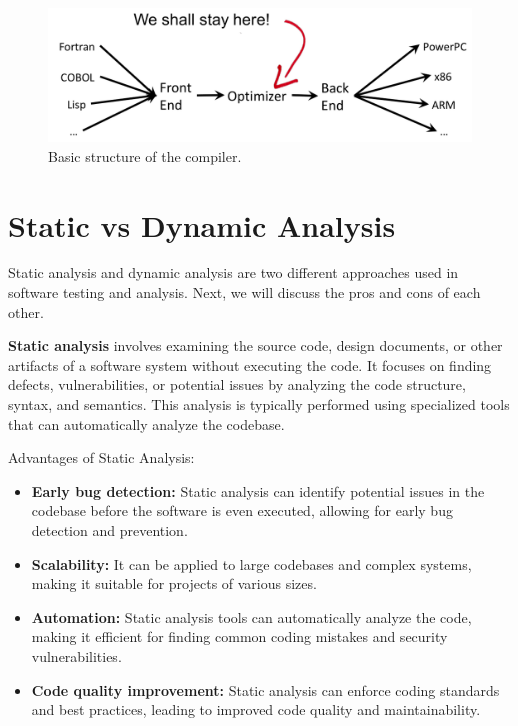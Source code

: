 \begin{figure}[ht]
    \centering
    \includegraphics[width=\textwidth]{img/compiler.png}
    \caption{Basic structure of the compiler.}
    \label{fig:compiler}
\end{figure}

\section{Static vs Dynamic Analysis}
\label{sec:analysis}

Static analysis and dynamic analysis are two different approaches used in software testing and analysis. Next, we will discuss the pros and cons of each other.

\textbf{Static analysis} involves examining the source code, design documents, or other artifacts of a software system without executing the code. It focuses on finding defects, vulnerabilities, or potential issues by analyzing the code structure, syntax, and semantics. This analysis is typically performed using specialized tools that can automatically analyze the codebase.

Advantages of Static Analysis:

\begin{itemize}
    \item \textbf{Early bug detection:} Static analysis can identify potential issues in the codebase before the software is even executed, allowing for early bug detection and prevention.
    \item \textbf{Scalability:} It can be applied to large codebases and complex systems, making it suitable for projects of various sizes.
    \item \textbf{Automation:} Static analysis tools can automatically analyze the code, making it efficient for finding common coding mistakes and security vulnerabilities.
    \item \textbf{Code quality improvement:} Static analysis can enforce coding standards and best practices, leading to improved code quality and maintainability.
\end{itemize}

